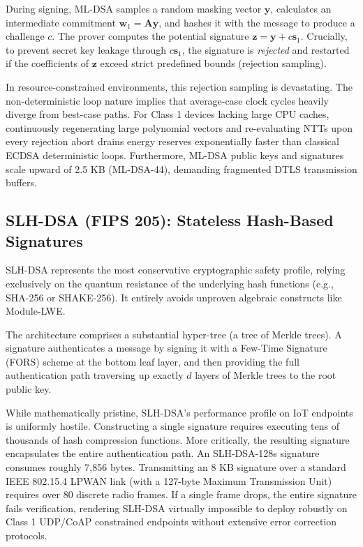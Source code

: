 During signing, ML-DSA samples a random masking vector $\mathbf{y}$, calculates an intermediate commitment $\mathbf{w}_1 = \mathbf{A}\mathbf{y}$, and hashes it with the message to produce a challenge $c$. The prover computes the potential signature $\mathbf{z} = \mathbf{y} + c\mathbf{s}_1$. Crucially, to prevent secret key leakage through $c\mathbf{s}_1$, the signature is \textit{rejected} and restarted if the coefficients of $\mathbf{z}$ exceed strict predefined bounds (rejection sampling).

In resource-constrained environments, this rejection sampling is devastating. The non-deterministic loop nature implies that average-case clock cycles heavily diverge from best-case paths. For Class 1 devices lacking large CPU caches, continuously regenerating large polynomial vectors and re-evaluating NTTs upon every rejection abort drains energy reserves exponentially faster than classical ECDSA deterministic loops. Furthermore, ML-DSA public keys and signatures scale upward of 2.5 KB (ML-DSA-44), demanding fragmented DTLS transmission buffers.

\subsection{SLH-DSA (FIPS 205): Stateless Hash-Based Signatures}
SLH-DSA represents the most conservative cryptographic safety profile, relying exclusively on the quantum resistance of the underlying hash functions (e.g., SHA-256 or SHAKE-256). It entirely avoids unproven algebraic constructs like Module-LWE.

The architecture comprises a substantial hyper-tree (a tree of Merkle trees). A signature authenticates a message by signing it with a Few-Time Signature (FORS) scheme at the bottom leaf layer, and then providing the full authentication path traversing up exactly $d$ layers of Merkle trees to the root public key. 

While mathematically pristine, SLH-DSA's performance profile on IoT endpoints is uniformly hostile. Constructing a single signature requires executing tens of thousands of hash compression functions. More critically, the resulting signature encapsulates the entire authentication path. An SLH-DSA-128s signature consumes roughly 7,856 bytes. Transmitting an 8 KB signature over a standard IEEE 802.15.4 LPWAN link (with a 127-byte Maximum Transmission Unit) requires over 80 discrete radio frames. If a single frame drops, the entire signature fails verification, rendering SLH-DSA virtually impossible to deploy robustly on Class 1 UDP/CoAP constrained endpoints without extensive error correction protocols.

